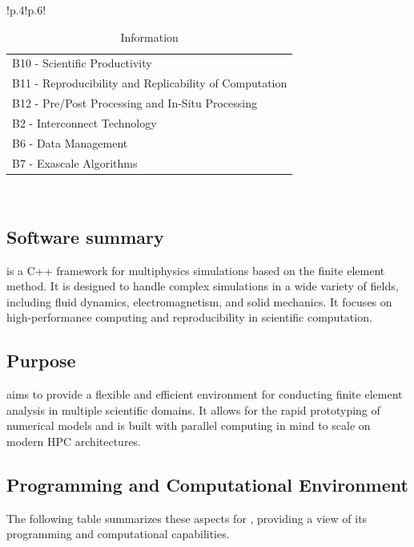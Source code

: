 \begin{table}[h!]
{{\begin{tabular}{!{\color{numpexgray}\vrule}p{.4\textwidth}!{\color{numpexgray}\vrule}p{.6\textwidth}!{\color{numpexgray}\vrule}}
\begin{tabular}{l}
B10 - Scientific Productivity\\
B11 - Reproducibility and Replicability of Computation\\
B12 - Pre/Post Processing and In-Situ Processing\\
B2 - Interconnect Technology\\
B6 - Data Management\\
B7 - Exascale Algorithms\\
\end{tabular} \\
        \bottomrule
    \end{tabular}
    }}
    \caption{\Feelpp Information}
\end{table}

\subsection{Software summary}
\label{sec:Feelpp:summary}
\Feelpp is a C++ framework for multiphysics simulations based on the finite element method. 
It is designed to handle complex simulations in a wide variety of fields, including fluid dynamics, electromagnetism, and solid mechanics. 
It focuses on high-performance computing and reproducibility in scientific computation.

\subsection{Purpose}
\label{sec:Feelpp:purpose}
\Feelpp aims to provide a flexible and efficient environment for conducting finite element analysis in multiple scientific domains. 
It allows for the rapid prototyping of numerical models and is built with parallel computing in mind to scale on modern HPC architectures.

\subsection{Programming and Computational Environment}
\label{sec::Feelpp:environment_capabilities}

The following table summarizes these aspects for \Feelpp, providing a view of its programming and computational capabilities.

